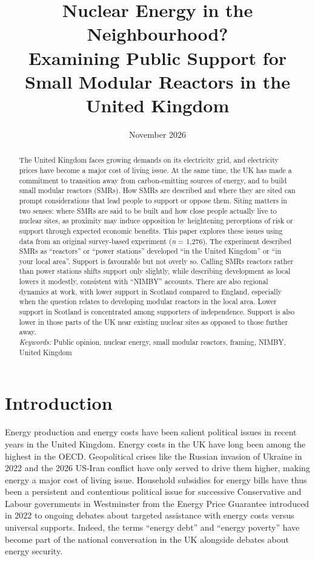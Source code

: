 \documentclass[a4paper, 11pt]{article}
\date{November 2026}
\author{}
\title{Nuclear Energy in the Neighbourhood?\\Examining Public Support for Small Modular Reactors in the United Kingdom}
\begin{document}
\maketitle

\begin{abstract}
\normalsize
\noindent The United Kingdom faces growing demands on its electricity grid, and electricity prices have become a major cost of living issue. At the same time, the UK has made a commitment to transition away from carbon-emitting sources of energy, and to build small modular reactors (SMRs). How SMRs are described and where they are sited can prompt considerations that lead people to support or oppose them. Siting matters in two senses: where SMRs are said to be built and how close people actually live to nuclear sites, as proximity may induce opposition by heightening perceptions of risk or support through expected economic benefits. This paper explores these issues using data from an original survey-based experiment (\textit{n} = 1,276). The experiment described SMRs as ``reactors'' or ``power stations'' developed ``in the United Kingdom'' or ``in your local area''. Support is favourable but not overly so. Calling SMRs reactors rather than power stations shifts support only slightly, while describing development as local lowers it modestly, consistent with ``NIMBY'' accounts. There are also regional dynamics at work, with lower support in Scotland compared to England, especially when the question relates to developing modular reactors in the local area. Lower support in Scotland is concentrated among supporters of independence. Support is also lower in those parts of the UK near existing nuclear sites as opposed to those further away.\\

\textit{Keywords:} Public opinion, nuclear energy, small modular reactors, framing, NIMBY, United Kingdom

\end{abstract}
\thispagestyle{empty}
\clearpage

\section{Introduction}
\setcounter{page}{1}
\doublespacing
Energy production and energy costs have been salient political issues in recent years in the United Kingdom. Energy costs in the UK have long been among the highest in the OECD. Geopolitical crises like the Russian invasion of Ukraine in 2022 and the 2026 US-Iran conflict have only served to drive them higher, making energy a major cost of living issue. Household subsidies for energy bills have thus been a persistent and contentious political issue for successive Conservative and Labour governments in Westminster from the Energy Price Guarantee introduced in 2022 to ongoing debates about targeted assistance with energy costs versus universal supports. Indeed, the terms ``energy debt'' and ``energy poverty'' have become part of the national conversation in the UK alongside debates about energy security.
\end{document}
